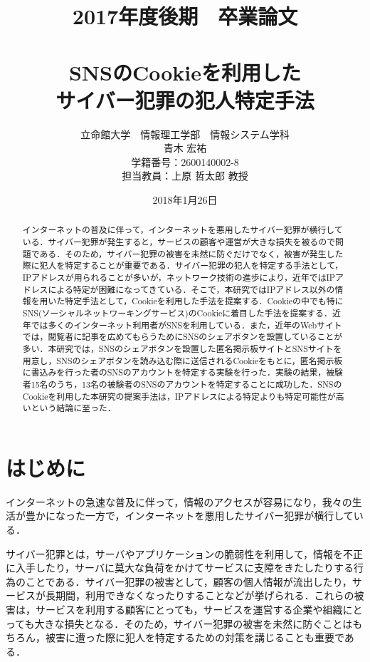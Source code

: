 \documentclass[10pt, a4paper]{jreport}
\title{2017年度後期　卒業論文\\　\\SNSのCookieを利用した\\サイバー犯罪の犯人特定手法}
\author{立命館大学　情報理工学部　情報システム学科\\青木 宏祐\\学籍番号：2600140002-8\\担当教員：上原 哲太郎 教授}
\date{2018年1月26日}
\begin{document}
\maketitle


\begin{abstract}
インターネットの普及に伴って，インターネットを悪用したサイバー犯罪が横行している．サイバー犯罪が発生すると，サービスの顧客や運営が大きな損失を被るので問題である．そのため，サイバー犯罪の被害を未然に防ぐだけでなく，被害が発生した際に犯人を特定することが重要である．サイバー犯罪の犯人を特定する手法として，IPアドレスが用られることが多いが，ネットワーク技術の進歩により，近年ではIPアドレスによる特定が困難になってきている．そこで，本研究ではIPアドレス以外の情報を用いた特定手法として，Cookieを利用した手法を提案する．Cookieの中でも特にSNS(ソーシャルネットワーキングサービス)のCookieに着目した手法を提案する．近年では多くのインターネット利用者がSNSを利用している．また，近年のWebサイトでは，閲覧者に記事を広めてもらうためにSNSのシェアボタンを設置していることが多い．本研究では，SNSのシェアボタンを設置した匿名掲示板サイトとSNSサイトを用意し，SNSのシェアボタンを読み込む際に送信されるCookieをもとに，匿名掲示板に書込みを行った者のSNSのアカウントを特定する実験を行った．実験の結果，被験者15名のうち，13名の被験者のSNSのアカウントを特定することに成功した．SNSのCookieを利用した本研究の提案手法は，IPアドレスによる特定よりも特定可能性が高いという結論に至った．
\end{abstract}

\tableofcontents

\chapter{はじめに}
\setcounter{page}{1}
インターネットの急速な普及に伴って，情報のアクセスが容易になり，我々の生活が豊かになった一方で，インターネットを悪用したサイバー犯罪が横行している．

サイバー犯罪とは，サーバやアプリケーションの脆弱性を利用して，情報を不正に入手したり，サーバに莫大な負荷をかけてサービスに支障をきたしたりする行為のことである．サイバー犯罪の被害として，顧客の個人情報が流出したり，サービスが長期間，利用できなくなったりすることなどが挙げられる．これらの被害は，サービスを利用する顧客にとっても，サービスを運営する企業や組織にとっても大きな損失となる．そのため，サイバー犯罪の被害を未然に防ぐことはもちろん，被害に遭った際に犯人を特定するための対策を講じることも重要である．
\end{document}
